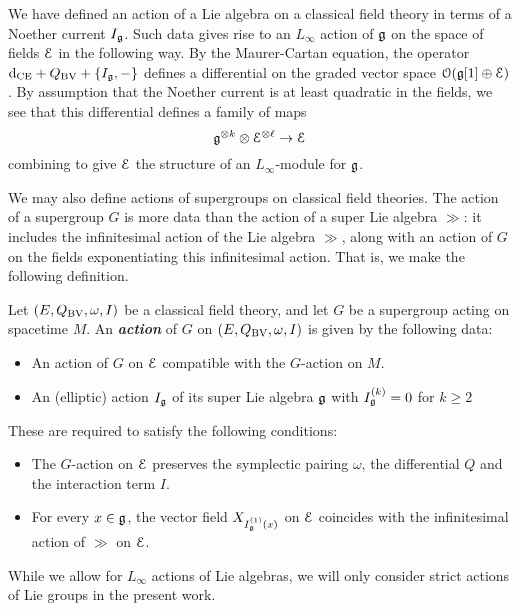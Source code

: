 \documentclass[10pt, oneside]{article}
\newcommand{\defterm}[1]{\textbf{\emph{#1}}}
\begin{document}
\begin{rmk}
We have defined an action of a Lie algebra on a classical field theory in terms of a Noether current $I_\mathfrak g$.
Such data gives rise to an $L_\infty$ action of $\mathfrak g$ on the space of fields $\mathcal E$ in the following way.
By the Maurer-Cartan equation, the operator ${\rm d}_{\mathrm{CE}} + Q_{\mathrm{BV}} + \{I_\mathfrak g, -\}$ 
defines a differential on the graded vector space $\mathcal O(\mathfrak g[1] \oplus \mathcal E)$. 
By assumption that the Noether current is at least quadratic in the fields, we see that this differential defines a family of maps
\[
\mathfrak g^{\otimes k} \otimes \mathcal E^{\otimes \ell} \to \mathcal E
\]
combining to give $\mathcal E$ the structure of an $L_\infty$-module for $\mathfrak g$.
\end{rmk}

We may also define actions of supergroups on classical field theories.  The action of a supergroup $G$ is more data than the action of a super Lie algebra $\gg$: it includes the infinitesimal action of the Lie algebra $\gg$, along with an action of $G$ on the fields exponentiating this infinitesimal action.  That is, we make the following definition.

\begin{definition}
\label{group_action_def}
Let $(E, Q_{\mathrm{BV}}, \omega, I)$ be a classical field theory, and let $G$ be a supergroup acting on spacetime $M$. An \defterm{action} of $G$ on $(E, Q_{\mathrm{BV}}, \omega, I)$ is given by the following data:
\begin{itemize}
\item An action of $G$ on $\mathcal E$ compatible with the $G$-action on $M$.

\item An (elliptic) action $I_\mathfrak g$ of its super Lie algebra $\mathfrak g$ with $I^{(k)}_\mathfrak g = 0$ for $k\geq 2$ 
\end{itemize}
These are required to satisfy the following conditions:
\begin{itemize}
\item The $G$-action on $\mathcal E$ preserves the symplectic pairing $\omega$, the differential $Q$ and the interaction term $I$.

\item For every $x\in\mathfrak g$, the vector field $X_{{I^{(1)}_\mathfrak g}(x)}$ on $\mathcal E$ coincides with the infinitesimal action of $\gg$ on $\mathcal E$.
\end{itemize}
\end{definition}

\begin{remark}
While we allow for $L_\infty$ actions of Lie algebras, we will only consider strict actions of Lie groups in the present work.
\end{remark}
\end{document}
